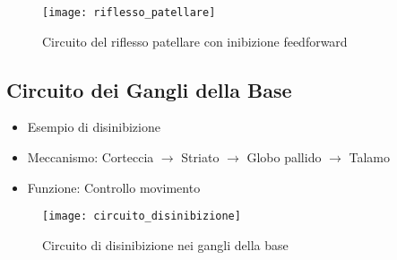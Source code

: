 \documentclass[12pt]{article}
\begin{document}
\begin{figure}[h]
    \centering
    \texttt{[image: riflesso\_patellare]}
    \caption{Circuito del riflesso patellare con inibizione feedforward}
\end{figure}

\subsection{Circuito dei Gangli della Base}
\begin{itemize}
    \item Esempio di disinibizione
    \item Meccanismo: Corteccia $\rightarrow$ Striato $\rightarrow$ Globo pallido $\rightarrow$ Talamo
    \item Funzione: Controllo movimento
\end{itemize}

\begin{figure}[h]
    \centering
    \texttt{[image: circuito\_disinibizione]}
    \caption{Circuito di disinibizione nei gangli della base}
\end{figure}
\end{document}
